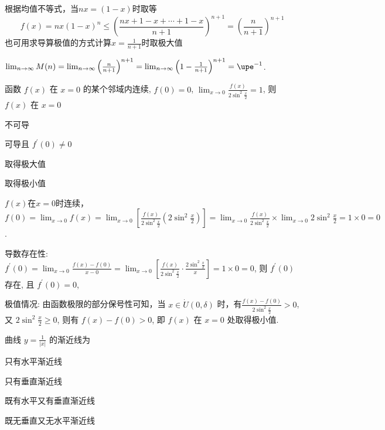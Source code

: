 \documentclass{CWNUExam}
\begin{document}
\begin{analysis}
  根据均值不等式，当$nx = (1-x)$时取等
  $$f(x) = nx(1-x)^{n} \le \left( \frac{ nx +1-x + \cdots + 1-x }{n+1} \right)^{n+1} = \left( \frac{n}{n+1} \right)^{n+1}$$
  也可用求导算极值的方式计算$x=\frac{1}{n+1}$时取极大值

  $\lim _{n \to \infty} M(n) = \lim _{n \to \infty} \left( \frac{n}{n+1} \right)^{n+1} = \lim _{n \to \infty} \left( 1-\frac{1}{n+1} \right)^{n+1} = \upe^{-1}$.
\end{analysis}

\begin{problem}
  函数 $f(x)$ 在 $x=0$ 的某个邻域内连续, $f(0)=0$, $\lim _{x \to 0} \frac{f(x)}{2 \sin ^{2} \frac{x}{2}}=1$, 则 $f(x)$ 在 $x=0$
  \paren[D]
  \begin{choices}
    \item 不可导
    \item 可导且 $f^{\prime}(0) \neq 0$
    \item 取得极大值
    \item 取得极小值
  \end{choices}
\end{problem}

\begin{analysis}
  $f(x)$在$x=0$时连续，$f(0) = \lim_{x \to 0} f(x) = \lim _{x \to 0} \left[ \frac{f(x)}{2 \sin ^{2} \frac{x}{2}} \left( 2 \sin ^{2} \frac{x}{2} \right) \right] = \lim _{x \to 0} \frac{f(x)}{2 \sin ^{2} \frac{x}{2}} \times \lim _{x \to 0} 2 \sin ^{2} \frac{x}{2} = 1 \times 0 = 0$.

  导数存在性: $f^{\prime}(0)=\lim _{x \to 0} \frac{f(x)-f(0)}{x-0}
    = \lim _{x \to 0}\left[ \frac{f(x)}{2 \sin ^{2} \frac{x}{2}} \cdot \frac{2 \sin ^{2} \frac{x}{2}}{x} \right]
    = 1 \times 0 = 0$, 则 $f^{\prime}(0)$ 存在, 且 $f^{\prime}(0)=0$,

  极值情况: 由函数极限的部分保号性可知，当 $x \in \dot{U}(0, \delta)$ 时，有$\frac{f(x)-f(0)}{2 \sin ^{2} \frac{x}{2}} > 0$, 又 $2 \sin ^{2} \frac{x}{2} \geqslant 0$, 则有 $f(x)-f(0)>0$, 即 $f(x)$ 在 $x=0$ 处取得极小值.
\end{analysis}

\begin{problem}
  曲线 $y=\frac{1}{|x|}$ 的渐近线为
  \paren[C]
  \begin{choices}
    \item 只有水平渐近线
    \item 只有垂直渐近线
    \item 既有水平又有垂直渐近线
    \item 既无垂直又无水平渐近线
  \end{choices}
\end{problem}
\end{document}
